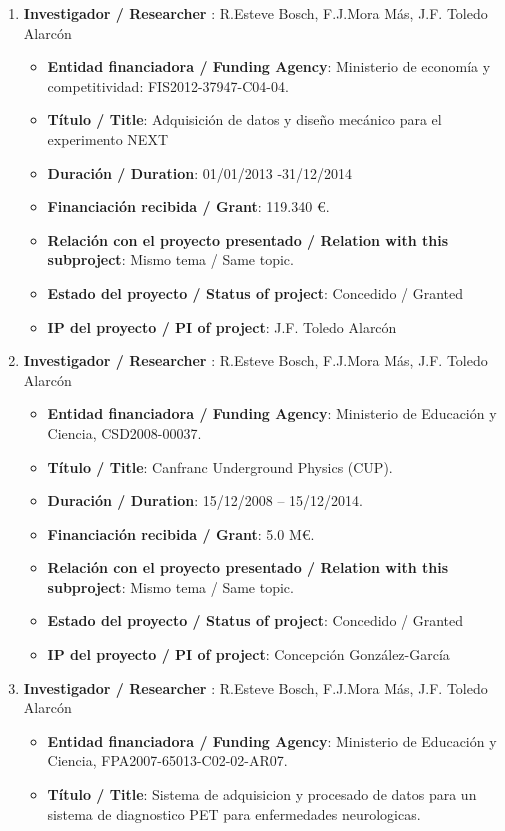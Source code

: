 \begin{enumerate}
\item {\bf Investigador / Researcher }: R.Esteve Bosch, F.J.Mora Más, J.F. Toledo Alarcón
\begin{itemize}
\item {\bf Entidad financiadora / Funding Agency}: Ministerio de economía y competitividad: FIS2012-37947-C04-04.
\item {\bf Título / Title}:  Adquisición de datos y diseño mecánico para el experimento NEXT
\item {\bf Duración / Duration}: 01/01/2013 -31/12/2014
\item {\bf Financiación recibida / Grant}: 119.340 \euro. 
\item {\bf Relación con el proyecto presentado / Relation with this subproject}: Mismo tema / Same topic. 
\item {\bf Estado del proyecto / Status of project}: Concedido / Granted
\item {\bf IP del proyecto / PI of project}: J.F. Toledo Alarcón
\end{itemize}
\item {\bf Investigador / Researcher }: R.Esteve Bosch, F.J.Mora Más, J.F. Toledo Alarcón
\begin{itemize}
\item {\bf Entidad financiadora / Funding Agency}: Ministerio de Educaci\'on y Ciencia, CSD2008-00037.
\item {\bf Título / Title}:  Canfranc Underground Physics (CUP).
\item {\bf Duración / Duration}: 15/12/2008 -- 15/12/2014. 
\item {\bf Financiación recibida / Grant}: 5.0 M\euro. 
\item {\bf Relación con el proyecto presentado / Relation with this subproject}: Mismo tema / Same topic. 
\item {\bf Estado del proyecto / Status of project}: Concedido / Granted
\item {\bf IP del proyecto / PI of project}: Concepción González-García 
\end{itemize}
\item {\bf Investigador / Researcher }: R.Esteve Bosch, F.J.Mora Más, J.F. Toledo Alarcón
\begin{itemize}
\item {\bf Entidad financiadora / Funding Agency}: Ministerio de Educaci\'on y Ciencia, FPA2007-65013-C02-02-AR07.
\item {\bf Título / Title}: Sistema de adquisicion y procesado de datos para un sistema de diagnostico PET para enfermedades neurologicas.

\end{itemize}
\end{enumerate}

